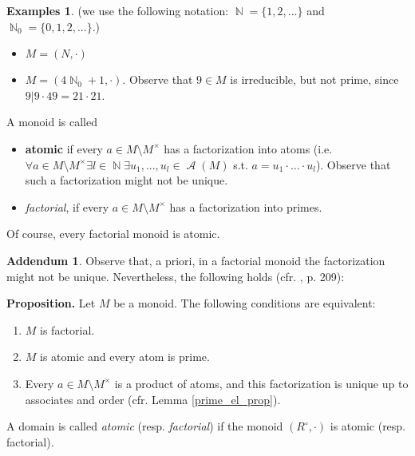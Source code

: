 \documentclass[12pt,a4paper]{report}
\theoremstyle{definition}
\newtheorem*{addendum}{Addendum}
\newtheorem*{examples}{Examples}
\theoremstyle{num.custom-title}
\DeclareMathOperator{\A}{\mathcal{A}}
\DeclareMathOperator{\N}{\mathbb{N}}
\DeclareMathOperator{\sm}{\setminus}
\begin{document}
\begin{examples} (we use the following notation: $\N=\{1,2,...\}$ and $\N_0 = \{0,1,2,...\}$.)
\begin{itemize}
\item $M=(N, \cdot)$
\item $M=(4\N_0+1, \cdot)$. Observe that $9 \in M$ is irreducible, but not prime, since $9|9 \cdot 49 = 21 \cdot 21$.
\end{itemize}
\end{examples}

\noindent A monoid is called 
\begin{itemize}
\item \textbf{atomic} if every $a \in M \sm M^\times$ has a factorization into atoms (i.e. $\forall a \in M \sm M^\times \exists l \in \N \exists u_1,...,u_l \in \A(M)$ s.t. $a=u_1 \cdot ... \cdot u_l$). Observe that such a factorization might not be unique.
\item \emph{factorial}, if every $a \in M \sm M^\times$ has a factorization into primes.
\end{itemize}

Of course, every factorial monoid is atomic.

\begin{addendum}
Observe that, a priori, in a factorial monoid the factorization might not be unique. Nevertheless, the following holds (cfr. \cite{Bre2006}, p. 209):

\textbf{Proposition.} Let $M$ be a monoid. The following conditions are equivalent:
\begin{enumerate}
\item $M$ is factorial.
\item $M$ is atomic and every atom is prime.
\item Every $a \in M \sm M^\times$ is a product of atoms, and this factorization is unique up to associates and order (cfr. Lemma \ref{prime_el_prop}).
\end{enumerate}
\end{addendum}

\noindent A domain is called \emph{atomic} (resp. \emph{factorial}) if the monoid $(R^\circ,\cdot)$ is atomic (resp. factorial).
\end{document}
